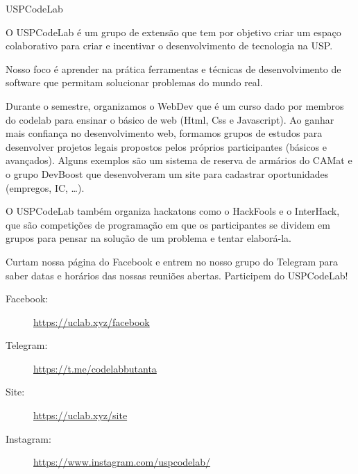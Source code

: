 \begin{subsecao}{USPCodeLab}


O USPCodeLab é um grupo de extensão que tem por objetivo criar um espaço
colaborativo para criar e incentivar o desenvolvimento de tecnologia na USP.

Nosso foco é aprender na prática ferramentas e técnicas de desenvolvimento de software que permitam
solucionar problemas do mundo real.

Durante o semestre, organizamos o WebDev que é um curso dado por membros do codelab para ensinar o
básico de web (Html, Css e Javascript). Ao ganhar mais confiança no desenvolvimento web, formamos
grupos de estudos para desenvolver projetos legais propostos pelos próprios participantes (básicos
e avançados). Alguns exemplos são um sistema de reserva de armários do CAMat e o grupo DevBoost que
desenvolveram um site para cadastrar oportunidades (empregos, IC, \dots). 

O USPCodeLab também organiza hackatons como o HackFools e o InterHack, que são competições de
programação em que os participantes se dividem em grupos para pensar na solução de um problema e tentar
elaborá-la.

Curtam nossa página do Facebook e entrem no nosso grupo do Telegram para saber
datas e horários das nossas reuniões abertas. Participem do USPCodeLab!

\begin{description}
\item[Facebook:] \url{https://uclab.xyz/facebook}
\item[Telegram:] \url{https://t.me/codelabbutanta}
\item[Site:] \url{https://uclab.xyz/site}
\item[Instagram:] \url{https://www.instagram.com/uspcodelab/}
\end{description}

\end{subsecao}
